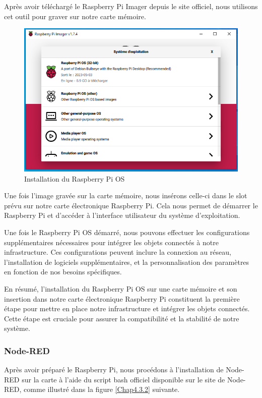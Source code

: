 Après avoir téléchargé le Raspberry Pi Imager depuis le site officiel, nous utilisons cet outil pour graver sur notre carte mémoire.

\begin{figure}[H]
 \centering
    \includegraphics[width=15cm]{Images/RaspberryPiOSInstall1.png}
    \caption{Installation du Raspberry Pi OS}
    \label{Chap4.3.1}
\end{figure}    

Une fois l'image gravée sur la carte mémoire, nous insérons celle-ci dans le slot prévu sur notre carte électronique Raspberry Pi. Cela nous permet de démarrer le Raspberry Pi et d'accéder à l'interface utilisateur du système d'exploitation.

Une fois le Raspberry Pi OS démarré, nous pouvons effectuer les configurations supplémentaires nécessaires pour intégrer les objets connectés à notre infrastructure. Ces configurations peuvent inclure la connexion au réseau, l'installation de logiciels supplémentaires, et la personnalisation des paramètres en fonction de nos besoins spécifiques.

En résumé, l'installation du Raspberry Pi OS sur une carte mémoire et son insertion dans notre carte électronique Raspberry Pi constituent la première étape pour mettre en place notre infrastructure et intégrer les objets connectés. Cette étape est cruciale pour assurer la compatibilité et la stabilité de notre système.

\subsubsection{Node-RED}

Après avoir préparé le Raspberry Pi, nous procédons à l'installation de Node-RED sur la carte à l'aide du script bash officiel disponible sur le site de Node-RED, comme illustré dans la figure \ref{Chap4.3.2} suivante.

